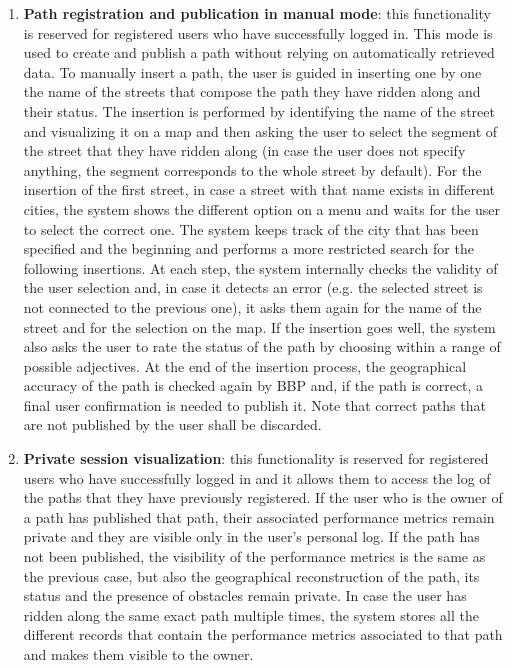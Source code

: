 \documentclass{article}
\begin{document}
\begin{enumerate}
    \item \textbf{Path registration and publication in manual mode}: this functionality is reserved for registered users who have successfully logged in. This mode is used to create and publish a path without relying on automatically retrieved data. To manually insert a path, the user is guided in inserting one by one the name of the streets that compose the path they have ridden along and their status. The insertion is performed by identifying the name of the street and visualizing it on a map and then asking the user to select the segment of the street that they have ridden along (in case the user does not specify anything, the segment corresponds to the whole street by default). For the insertion of the first street, in case a street with that name exists in different cities, the system shows the different option on a menu and waits for the user to select the correct one. The system keeps track of the city that has been specified and the beginning and performs a more restricted search for the following insertions. At each step, the system internally checks the validity of the user selection and, in case it detects an error (e.g. the selected street is not connected to the previous one), it asks them again for the name of the street and for the selection on the map. If the insertion goes well, the system also asks the user to rate the status of the path by choosing within a range of possible adjectives. At the end of the insertion process, the geographical accuracy of the path is checked again by BBP and, if the path is correct, a final user confirmation is needed to publish it. Note that correct paths that are not published by the user shall be discarded.
    \item \textbf{Private session visualization}: this functionality is reserved for registered users who have successfully logged in and it allows them to access the log of the paths that they have previously registered. If the user who is the owner of a path has published that path, their associated performance metrics remain private and they are visible only in the user's personal log. If the path has not been published, the visibility of the performance metrics is the same as the previous case, but also the geographical reconstruction of the path, its status and the presence of obstacles remain private. In case the user has ridden along the same exact path multiple times, the system stores all the different records that contain the performance metrics associated to that path and makes them visible to the owner.

\end{enumerate}
\end{document}
